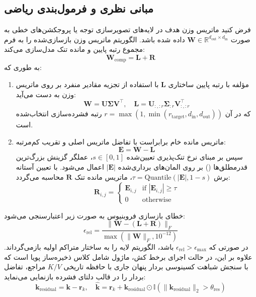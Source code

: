 \subsection{مبانی نظری و فرمول‌بندی ریاضی}
فرض کنید ماتریس وزن هدف در لایه‌های تصویرسازی توجه یا پروجکشن‌های خطی به صورت $\mathbf{W} \in \mathbb{R}^{d_{\text{out}} \times d_{\text{in}}}$ داده شده باشد. الگوریتم  ماتریس وزن بازسازی‌شده را به فرم مجموع رتبه پایین و مانده تنک مدل‌سازی می‌کند:
\begin{equation}
\mathbf{W}_{\text{comp}} = \mathbf{L} + \mathbf{R}
\end{equation}
به طوری که:
\begin{enumerate}
    \item مؤلفه با رتبه پایین ساختاری $\mathbf{L}$ با استفاده از تجزیه مقادیر منفرد بر روی ماتریس وزن به دست می‌آید:
    \begin{equation}
    \mathbf{W} = \mathbf{U} \mathbf{\Sigma} \mathbf{V}^\top, \quad \mathbf{L} = \mathbf{U}_{:, :r} \mathbf{\Sigma}_{:r} \mathbf{V}_{:, :r}^\top
    \end{equation}
    که در آن $r = \max(1, \min(r_{\text{target}}, d_{\text{in}}, d_{\text{out}}))$ رتبه فشرده‌سازی انتخاب‌شده است.
    \item ماتریس مانده خام برابراست با تفاضل ماتریس اصلی و تقریب کم‌مرتبه:
    \begin{equation}
    \mathbf{E} = \mathbf{W} - \mathbf{L}
    \end{equation}
    سپس بر مبنای نرخ تنک‌پذیری تعیین‌شده $s \in [0, 1]$، عملگر گزینش بزرگ‌ترین قدرمطلق‌ها () بر روی المان‌های برداری‌شده $|\mathbf{E}|$ اعمال می‌شود. با تعیین آستانه برش $\tau = \text{Quantile}(|\mathbf{E}|, 1 - s)$، ماتریس مانده تنک $\mathbf{R}$ محاسبه می‌گردد:
    \begin{equation}
    \mathbf{R}_{i, j} = \begin{cases} 
    \mathbf{E}_{i, j} & \text{if } |\mathbf{E}_{i, j}| \ge \tau \\
    0 & \text{otherwise}
    \end{cases}
    \end{equation}
\end{enumerate}

خطای بازسازی فروبنیوس به صورت زیر اعتبارسنجی می‌شود:
\begin{equation}
\epsilon_{\text{rel}} = \frac{\|\mathbf{W} - (\mathbf{L} + \mathbf{R})\|_F}{\max(\|\mathbf{W}\|_F, 10^{-12})}
\end{equation}
در صورتی که $\epsilon_{\text{rel}} > \epsilon_{\text{max}}$ باشد، الگوریتم لایه را به ساختار متراکم اولیه بازمی‌گرداند. علاوه بر این، در حالت اجرای برخط کش، ماژول شامل کلاس ذخیره‌ساز پویا  است که با سنجش شباهت کسینوسی بردار پنهان جاری با حافظه تاریخی $K/V$ مراجع، تفاضل بردار را در قالب دلتای فشرده بازنمایی می‌نماید:
\begin{equation}
\mathbf{k}_{\text{residual}} = \mathbf{k} - \mathbf{r}_k, \quad \hat{\mathbf{k}} = \mathbf{r}_k + \mathbf{k}_{\text{residual}} \odot \mathbb{I}(\|\mathbf{k}_{\text{residual}}\|_2 > \theta_{\text{res}})
\end{equation}

